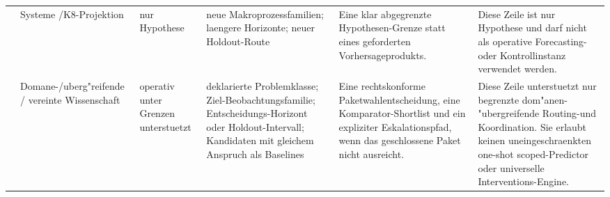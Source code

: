\begin{longtable}{@{}L{0.13\textwidth}L{0.14\textwidth}L{0.12\textwidth}L{0.18\textwidth}L{0.17\textwidth}L{0.20\textwidth}@{}}
 & Systeme /\allowbreak K8-Projektion & nur Hypothese & neue Makroprozessfamilien; \allowbreak laengere Horizonte; \allowbreak neuer Holdout-Route & Eine klar abgegrenzte Hypothesen-Grenze statt eines geforderten Vorhersageprodukts. & Diese Zeile ist nur Hypothese und darf nicht als operative Forecasting- oder Kontrollinstanz verwendet werden. \\
 & Domane-/\allowbreak uberg"reifende / vereinte Wissenschaft & operativ unter Grenzen unterstuetzt & deklarierte Problemklasse; \allowbreak Ziel-Beobachtungsfamilie; \allowbreak Entscheidungs-Horizont oder Holdout-Intervall; \allowbreak Kandidaten mit gleichem Anspruch als Baselines & Eine rechtskonforme Paketwahlentscheidung, eine Komparator-Shortlist und ein expliziter Eskalationspfad, wenn das geschlossene Paket nicht ausreicht. & Diese Zeile unterstuetzt nur begrenzte dom"anen-\allowbreak "ubergreifende Routing-und Koordination. Sie erlaubt keinen uneingeschraenkten one-shot scoped-Predictor oder universelle Interventions-Engine. \\
\bottomrule
\end{longtable}

